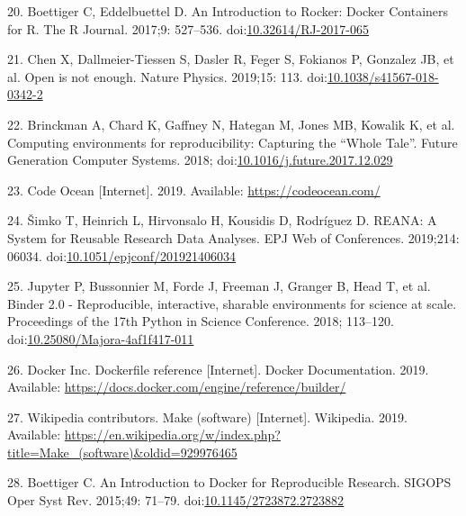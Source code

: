 \documentclass[10pt,letterpaper]{article}
\begin{document}
\leavevmode\hypertarget{ref-boettiger_introduction_2017}{}%
20. Boettiger C, Eddelbuettel D. An Introduction to Rocker: Docker
Containers for R. The R Journal. 2017;9: 527--536.
doi:\href{https://doi.org/10.32614/RJ-2017-065}{10.32614/RJ-2017-065}

\leavevmode\hypertarget{ref-chen_open_2019}{}%
21. Chen X, Dallmeier-Tiessen S, Dasler R, Feger S, Fokianos P, Gonzalez
JB, et al. Open is not enough. Nature Physics. 2019;15: 113.
doi:\href{https://doi.org/10.1038/s41567-018-0342-2}{10.1038/s41567-018-0342-2}

\leavevmode\hypertarget{ref-brinckman_computing_2018}{}%
22. Brinckman A, Chard K, Gaffney N, Hategan M, Jones MB, Kowalik K, et
al. Computing environments for reproducibility: Capturing the ``Whole
Tale''. Future Generation Computer Systems. 2018;
doi:\href{https://doi.org/10.1016/j.future.2017.12.029}{10.1016/j.future.2017.12.029}

\leavevmode\hypertarget{ref-code_ocean_2019}{}%
23. Code Ocean {[}Internet{]}. 2019. Available:
\url{https://codeocean.com/}

\leavevmode\hypertarget{ref-simko_reana_2019}{}%
24. Šimko T, Heinrich L, Hirvonsalo H, Kousidis D, Rodríguez D. REANA: A
System for Reusable Research Data Analyses. EPJ Web of Conferences.
2019;214: 06034.
doi:\href{https://doi.org/10.1051/epjconf/201921406034}{10.1051/epjconf/201921406034}

\leavevmode\hypertarget{ref-jupyter_binder_2018}{}%
25. Jupyter P, Bussonnier M, Forde J, Freeman J, Granger B, Head T, et
al. Binder 2.0 - Reproducible, interactive, sharable environments for
science at scale. Proceedings of the 17th Python in Science Conference.
2018; 113--120.
doi:\href{https://doi.org/10.25080/Majora-4af1f417-011}{10.25080/Majora-4af1f417-011}

\leavevmode\hypertarget{ref-docker_inc_dockerfile_2019}{}%
26. Docker Inc. Dockerfile reference {[}Internet{]}. Docker
Documentation. 2019. Available:
\url{https://docs.docker.com/engine/reference/builder/}

\leavevmode\hypertarget{ref-wikipedia_contributors_make_2019}{}%
27. Wikipedia contributors. Make (software) {[}Internet{]}. Wikipedia.
2019. Available:
\url{https://en.wikipedia.org/w/index.php?title=Make_(software)\&oldid=929976465}

\leavevmode\hypertarget{ref-boettiger_introduction_2015}{}%
28. Boettiger C. An Introduction to Docker for Reproducible Research.
SIGOPS Oper Syst Rev. 2015;49: 71--79.
doi:\href{https://doi.org/10.1145/2723872.2723882}{10.1145/2723872.2723882}
\end{document}
